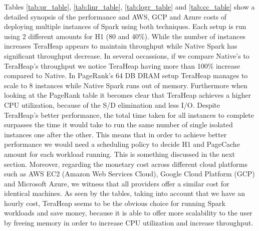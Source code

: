 Tables \ref{tab:pr_table}, \ref{tab:linr_table}, \ref{tab:logr_table}
and \ref{tab:cc_table} show a detailed synopsis of the performance and
AWS, GCP and Azure costs of deploying multiple instances of Spark
using both techniques. Each setup is run using 2 different amounts for
H1 (80 and 40\%). While the number of instances increases TeraHeap
appears to maintain throughput while Native Spark has significant
throughput decrease. In several occassions, if we compare Native's to
TeraHeap's throughput we notice TeraHeap having more than 100\%
increase compared to Native. In PageRank's 64 DB DRAM setup TeraHeap
manages to scale to 8 instances while Native Spark runs out of memory.
Furthermore when looking at the PageRank table it becomes clear that
TeraHeap achieves a higher CPU utilization, because of the S/D
elimination and less I/O. Despite TeraHeap's better performance, the
total time taken for all instances to complete surpasses the time it
would take to run the same number of single isolated instances one
after the other. This means that in order to achieve better
performance we would need a scheduling policy to decide H1 and
PageCache amount for each workload running. This is something
discussed in the next section. Moreover, regarding the monetary cost
across different cloud platforms such as AWS EC2 (Amazon Web Services
Cloud), Google Cloud Platform (GCP) and Microsoft Azure, we witness
that all providers offer a similar cost for identical machines. As
seen by the tables, taking into account that we have an hourly cost,
TeraHeap seems to be the obvious choice for running Spark workloads
and save money, because it is able to offer more scalability to the
user by freeing memory in order to increase CPU utilization and
increase throughput. 
